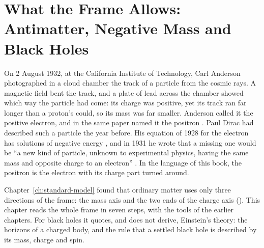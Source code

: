 \providecommand{\Com}{\operatorname{Com}}
\providecommand{\Sh}{\operatorname{Sh}}
\chapter{What the Frame Allows: Antimatter, Negative Mass and Black Holes}\label{ch:allows}



On 2 August 1932, at the California Institute of Technology, Carl Anderson photographed in a cloud chamber the track of a particle from the cosmic rays. A magnetic field bent the track, and a plate of lead across the chamber showed which way the particle had come: its charge was positive, yet its track ran far longer than a proton's could, so its mass was far smaller. Anderson called it the positive electron, and in the same paper named it the positron \citep{Anderson1933}. Paul Dirac had described such a particle the year before. His equation of 1928 for the electron has solutions of negative energy \citep{Dirac1928}, and in 1931 he wrote that a missing one would be \enquote{a new kind of particle, unknown to experimental physics, having the same mass and opposite charge to an electron} \citep{Dirac1931}. In the language of this book, the positron is the electron with its charge part turned around.

\bigskip

Chapter~\ref{ch:standard-model} found that ordinary matter uses only three directions of the frame: the mass axis and the two ends of the charge axis (). This chapter reads the whole frame in seven steps, with the tools of the earlier chapters. For black holes it quotes, and does not derive, Einstein's theory: the horizons of a charged body, and the rule that a settled black hole is described by its mass, charge and spin.

